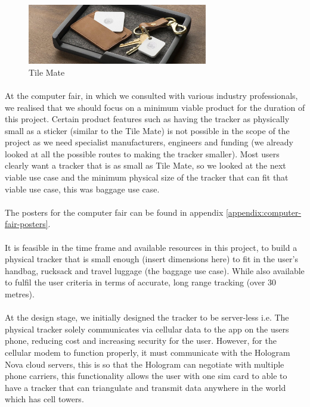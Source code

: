 \documentclass[12pt,a4paper]{article}
\begin{document}
        \begin{figure}[H]
          \centering
          \includegraphics[width=0.7\textwidth]{../assets/design-concept-tile-mate.jpg}
          \caption{Tile Mate}
          \label{fig:Tile Mate}
        \end{figure}
        
        \paragraph{} At the computer fair, in which we consulted with various industry professionals, we realised that we should focus on a minimum viable product for the duration of this project. Certain product features such as having the tracker as physically small as a sticker (similar to the Tile Mate) is not possible in the scope of the project as we need specialist manufacturers, engineers and funding (we already looked at all the possible routes to making the tracker smaller). Most users clearly want a tracker that is as small as Tile Mate, so we looked at the next viable use case and the minimum physical size of the tracker that can fit that viable use case, this was baggage use case. 

        \paragraph{} The posters for the computer fair can be found in appendix \ref{appendix:computer-fair-posters}. 
        
        \paragraph{} It is feasible in the time frame and available resources in this project, to build a physical tracker that is small enough (insert dimensions here) to fit in the user’s handbag, rucksack and travel luggage (the baggage use case). While also available to fulfil the user criteria in terms of accurate, long range tracking (over 30 metres).
        
        \paragraph{} At the design stage, we initially designed the tracker to be server-less i.e. The physical tracker solely communicates via cellular data to the app on the users phone, reducing cost and increasing security for the user. However, for the cellular modem to function properly, it must communicate with the Hologram Nova cloud servers, this is so that the Hologram can negotiate with multiple phone carriers, this functionality allows the user with one sim card to able to have a tracker that can triangulate and transmit data anywhere in the world which has cell towers.
        
\end{document}
